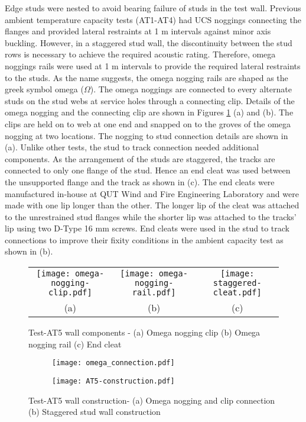 Edge studs were nested to avoid bearing failure of studs in the test wall. Previous ambient temperature capacity tests (AT1-AT4) had UCS noggings connecting the flanges and provided lateral restraints at 1 m intervals against minor axis buckling. However, in a staggered stud wall, the discontinuity between the stud rows is necessary to achieve the required acoustic rating. Therefore, omega noggings rails were used at 1 m intervals to provide the required lateral restraints to the studs. As the name suggests, the omega nogging rails are shaped as the greek symbol omega ($\Omega$). The omega noggings are connected to every alternate studs on the stud webs at service holes through a connecting clip. Details of the omega nogging and the connecting clip are shown in Figures \ref{fig:Omega-nogging-connections} (a) and (b). The clips are held on to web at one end and snapped on to the groves of the omega nogging at two locations. The nogging to stud connection details are shown in  (a). Unlike other tests, the stud to track connection needed additional components. As the arrangement of the studs are staggered, the tracks are connected to only one flange of the stud. Hence an end cleat was used between the unsupported flange and the track as shown in  (c). The end cleats were manufactured in-house at QUT Wind and Fire Engineering Laboratory and were made with one lip longer than the other. The longer lip of the cleat was attached to the unrestrained stud flanges while the shorter lip was attached to the tracks' lip using two D-Type 16 mm screws. End cleats were used in the stud to track connections to improve their fixity conditions in the ambient capacity test as shown in  (b). 
\begin{figure}[!htbp]
	\centering
		\begin{tabular}{ccc}
			\texttt{[image: omega-nogging-clip.pdf]} & 
			\texttt{[image: omega-nogging-rail.pdf]} & 
			\texttt{[image: staggered-cleat.pdf]} \\
			(a) & (b) & (c) \\ 
		\end{tabular} 
		\caption{Test-AT5 wall components - (a) Omega nogging clip (b) Omega nogging rail (c) End cleat}
		\label{fig:Omega-nogging-connections}
\end{figure}
\begin{figure}[!htbp]
	\centering
	\begin{subfigure}[b]{0.5\textwidth}
		\centering
		\texttt{[image: omega\_connection.pdf]}
		\caption{}
		\label{subfig:omega_connection}
	\end{subfigure}
	\begin{subfigure}[b]{0.8\textwidth}
		\centering
		\texttt{[image: AT5-construction.pdf]}
		\caption{}
		\label{subfig:AT5-wall-construction}
	\end{subfigure}
	   \caption{Test-AT5 wall construction- (a) Omega nogging and clip connection (b) Staggered stud wall construction}
	   \label{fig:AT5-construction}
\end{figure}
